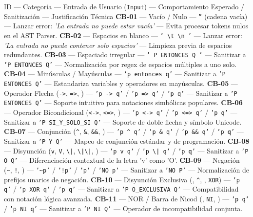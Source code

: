 \documentclass[11pt,a4paper,openany]{book}
\begin{document}
ID --- Categoría --- Entrada de Usuario (\texttt{Input}) --- Comportamiento Esperado / Sanitización --- Justificación Técnica
\textbf{CB-01} --- Vacío / Nulo --- \texttt{''} (cadena vacía) --- Lanzar error: \textit{'La entrada no puede estar vacía'} --- Evita procesar tokens nulos en el AST Parser.
\textbf{CB-02} --- Espacios en blanco --- \texttt{'   \textbackslash{}t   \textbackslash{}n  '} --- Lanzar error: \textit{'La entrada no puede contener solo espacios'} --- Limpieza previa de espacios redundantes.
\textbf{CB-03} --- Espaciado irregular --- \texttt{'  P   ENTONCES    Q  '} --- Sanitizar a \texttt{'P ENTONCES Q'} --- Normalización por regex de espacios múltiples a uno solo.
\textbf{CB-04} --- Minúsculas / Mayúsculas --- \texttt{'p entonces q'} --- Sanitizar a \texttt{'P ENTONCES Q'} --- Estandariza variables y operadores en mayúsculas.
\textbf{CB-05} --- Operador Flecha (\texttt{->}, \texttt{=>}, \texttt{}) --- \texttt{'p -> q'} / \texttt{'p => q'} / \texttt{'p  q'} --- Sanitizar a \texttt{'P ENTONCES Q'} --- Soporte intuitivo para notaciones simbólicas populares.
\textbf{CB-06} --- Operador Bicondicional (\texttt{<->}, \texttt{<=>}, \texttt{}) --- \texttt{'p <-> q'} / \texttt{'p <=> q'} / \texttt{'p  q'} --- Sanitizar a \texttt{'P SI\_Y\_SOLO\_SI Q'} --- Soporte de doble flecha y símbolo Unicode.
\textbf{CB-07} --- Conjunción (\texttt{\textasciicircum{}}, \texttt{\&}, \texttt{\&\&}, \texttt{}) --- \texttt{'p \textasciicircum{} q'} / \texttt{'p \& q'} / \texttt{'p \&\& q'} / \texttt{'p  q'} --- Sanitizar a \texttt{'P Y Q'} --- Mapeo de conjunción estándar y de programación.
\textbf{CB-08} --- Disyunción (\texttt{v}, \texttt{V}, \texttt{\textbackslash{}|}, \texttt{\textbackslash{}|\textbackslash{}|}, \texttt{}) --- \texttt{'p v q'} / \texttt{'p \textbackslash{}| q'} / \texttt{'p  q'} --- Sanitizar a \texttt{'P O Q'} --- Diferenciación contextual de la letra 'v' como 'O'.
\textbf{CB-09} --- Negación (\texttt{\textasciitilde{}}, \texttt{!}, \texttt{}) --- \texttt{'\textasciitilde{}p'} / \texttt{'!p'} / \texttt{'p'} / \texttt{'NO p'} --- Sanitizar a \texttt{'NO P'} --- Normalización de prefijos unarios de negación.
\textbf{CB-10} --- Disyunción Exclusiva (\texttt{}, \texttt{\textasciicircum{}}, \texttt{}, \texttt{XOR}) --- \texttt{'p  q'} / \texttt{'p XOR q'} / \texttt{'p  q'} --- Sanitizar a \texttt{'P O\_EXCLUSIVA Q'} --- Compatibilidad con notación lógica avanzada.
\textbf{CB-11} --- NOR / Barra de Nicod (\texttt{}, \texttt{NI}, \texttt{}) --- \texttt{'p  q'} / \texttt{'p NI q'} --- Sanitizar a \texttt{'P NI Q'} --- Operador de incompatibilidad conjunta.
\end{document}
